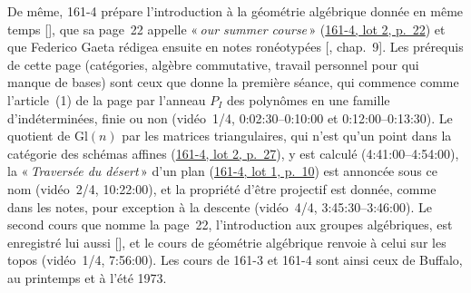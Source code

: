 \documentclass[11pt]{amsart}
\makeatletter
\newcommand{\ts}[1]{\foreignlanguage{english}{#1}}
\newcommand{\q}[1]{«\,\textit{#1}\,»}
\def\RHM@first#1--#2\@nil{#1}
\DeclareRobustCommand{\lot}[3]{\begingroup\edef\RHM@pdfpage{\the\numexpr\RHM@first#3--\@nil+1\relax}\href{https://grothendieck.umontpellier.fr/#1.pdf\#page=\RHM@pdfpage}{#1, lot #2, p.~#3}\endgroup}
\newcommand{\lot}[3]{\href{https://grothendieck.commutator.io/\##1/#2/p#3}{#1, lot #2, p.~#3}}
\makeatother
\begin{document}
De même, 161-4 prépare l'introduction à la géométrie algébrique donnée en même temps [\citealp{buffalo1973ag}], que sa page~22 appelle \q{our summer course} (\lot{161-4}{2}{22}) et que Federico Gaeta rédigea ensuite en notes ronéotypées [\citealp{circle-spirit}, chap.~9]. Les prérequis de cette page (catégories, algèbre commutative, travail personnel pour qui manque de bases) sont ceux que donne la première séance, qui commence comme l'article~(1) de la page par l'anneau $P_{I}$ des polynômes en une famille d'indéterminées, finie ou non (vidéo~1/4, \ts{0:02:30--0:10:00} et \ts{0:12:00--0:13:30}). Le quotient de $\mathrm{Gl}(n)$ par les matrices triangulaires, qui n'est qu'un point dans la catégorie des schémas affines (\lot{161-4}{2}{27}), y est calculé (\ts{4:41:00--4:54:00}), la \q{Traversée du désert} d'un plan (\lot{161-4}{1}{10}) est annoncée sous ce nom (vidéo~2/4, \ts{10:22:00}), et la propriété d'être projectif est donnée, comme dans les notes, pour exception à la descente (vidéo~4/4, \ts{3:45:30--3:46:00}). Le second cours que nomme la page~22, l'introduction aux groupes algébriques, est enregistré lui aussi [\citealp{buffalo1973groups}], et le cours de géométrie algébrique renvoie à celui sur les topos (vidéo~1/4, \ts{7:56:00}). Les cours de 161-3 et 161-4 sont ainsi ceux de Buffalo, au printemps et à l'été 1973.
\end{document}
